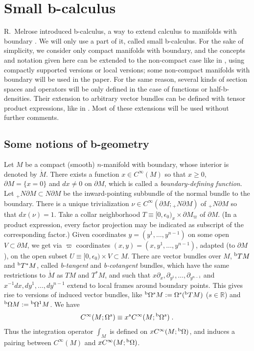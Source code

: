 \documentclass{memo-l}
\theoremstyle{plain}
\theoremstyle{definition}
\theoremstyle{remark}
\newcommand{\R}{\mathbb{R}}
\newcommand{\bOmega}{{}^{\text{\rm b}}\Omega}
\newcommand{\bT}{{}^{\text{\rm b}}T}
\numberwithin{section}{chapter}
\numberwithin{equation}{section}%
\begin{document}
\section{Small b-calculus}\label{s: b-calculus}

 R.~Melrose introduced b-calculus, a way to extend calculus to manifolds with boundary \cite{Melrose1993,Melrose1996}. We will only use a part of it, called small b-calculus. For the sake of simplicity, we consider only compact manifolds with boundary, and the concepts and notation given here can be extended to the non-compact case like in , using compactly supported versions or local versions; some non-compact manifolds with boundary will be used in the paper. For the same reason, several kinds of section spaces and operators will be only defined in the case of functions or half-b-densities. Their extension to arbitrary vector bundles can be defined with tensor product expressions, like in . Most of these extensions will be used without further comments.

\subsection{Some notions of b-geometry}\label{ss: b-geometry}

Let $M$ be a compact (smooth) $n$-manifold with boundary, whose interior is denoted by $\mathring M$. There exists a function $x\in C^\infty(M)$ so that $x\ge0$, $\partial M=\{x=0\}$ and $dx\ne0$ on $\partial M$, which is called a \emph{boundary-defining function}.  Let ${}_+N\partial M\subset N\partial M$ be the inward-pointing subbundle of the normal bundle to the boundary. There is a unique trivialization $\nu\in C^\infty(\partial M;{}_+N\partial M)$ of ${}_+N\partial M$ so that $dx(\nu)=1$. Take a collar neighborhood $T\equiv[0,\epsilon_0)_x\times\partial M_\varpi$ of $\partial M$. (In a product expression, every factor projection may be indicated as subscript of the corresponding factor.) Given coordinates $y=(y^1,\dots,y^{n-1})$ on some open $V\subset\partial M$, we get via $\varpi$ coordinates $(x,y)=(x,y^1,\dots,y^{n-1})$, adapted (to $\partial M$), on the open subset $U\equiv[0,\epsilon_0)\times V\subset M$. There are vector bundles over $M$, $\bT M$ and $\bT^*M$, \index{$\bT M$} \index{$\bT^*M$} called \emph{b-tangent} and \emph{b-cotangent} bundles, which have the same restrictions to $\mathring M$ as $TM$ and $T^*M$, and such that $x\partial_x,\partial_{y^1},\dots,\partial_{y^{n-1}}$ and $x^{-1}dx,dy^1,\dots,dy^{n-1}$ extend to local frames around boundary points. This gives rise to versions of induced vector bundles, like $\bOmega^sM:=\Omega^s(\bT M)$ ($s\in\R$) and $\bOmega M:=\bOmega^1M$. We have
\begin{equation}\label{C^infty(M Omega^s) equiv x^s C^infty(M bOmega^s)}
C^\infty(M;\Omega^s)\equiv x^sC^\infty(M;\bOmega^s)\;.
\end{equation}
Thus the integration operator $\int_M$ is defined on $xC^\infty(M;\bOmega)$, and induces a pairing between $C^\infty(M)$ and $xC^\infty(M;\bOmega)$.
\end{document}

